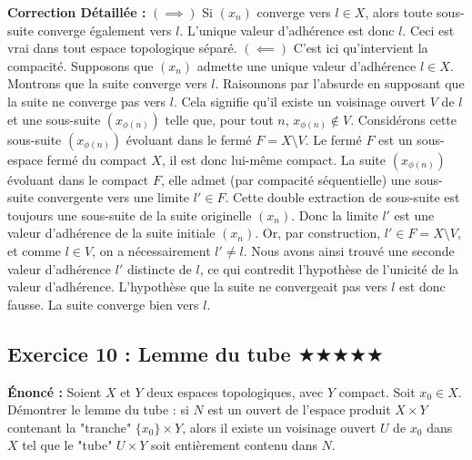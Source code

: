 \documentclass[11pt,a4paper]{article}
\begin{document}
\textbf{Correction Détaillée :}
$(\implies)$ Si $(x_n)$ converge vers $l \in X$, alors toute sous-suite converge également vers $l$. L'unique valeur d'adhérence est donc $l$. Ceci est vrai dans tout espace topologique séparé.
$(\impliedby)$ C'est ici qu'intervient la compacité. Supposons que $(x_n)$ admette une unique valeur d'adhérence $l \in X$. Montrons que la suite converge vers $l$.
Raisonnons par l'absurde en supposant que la suite ne converge pas vers $l$.
Cela signifie qu'il existe un voisinage ouvert $V$ de $l$ et une sous-suite $(x_{\phi(n)})$ telle que, pour tout $n$, $x_{\phi(n)} \notin V$.
Considérons cette sous-suite $(x_{\phi(n)})$ évoluant dans le fermé $F = X \setminus V$.
Le fermé $F$ est un sous-espace fermé du compact $X$, il est donc lui-même compact.
La suite $(x_{\phi(n)})$ évoluant dans le compact $F$, elle admet (par compacité séquentielle) une sous-suite convergente vers une limite $l' \in F$.
Cette double extraction de sous-suite est toujours une sous-suite de la suite originelle $(x_n)$.
Donc la limite $l'$ est une valeur d'adhérence de la suite initiale $(x_n)$.
Or, par construction, $l' \in F = X \setminus V$, et comme $l \in V$, on a nécessairement $l' \neq l$.
Nous avons ainsi trouvé une seconde valeur d'adhérence $l'$ distincte de $l$, ce qui contredit l'hypothèse de l'unicité de la valeur d'adhérence.
L'hypothèse que la suite ne convergeait pas vers $l$ est donc fausse. La suite converge bien vers $l$.

\subsection*{Exercice 10 : Lemme du tube \quad $\bigstar\bigstar\bigstar\bigstar\bigstar$}

\textbf{Énoncé :} Soient $X$ et $Y$ deux espaces topologiques, avec $Y$ compact. Soit $x_0 \in X$. Démontrer le lemme du tube : si $N$ est un ouvert de l'espace produit $X \times Y$ contenant la "tranche" $\{x_0\} \times Y$, alors il existe un voisinage ouvert $U$ de $x_0$ dans $X$ tel que le "tube" $U \times Y$ soit entièrement contenu dans $N$.
\end{document}
